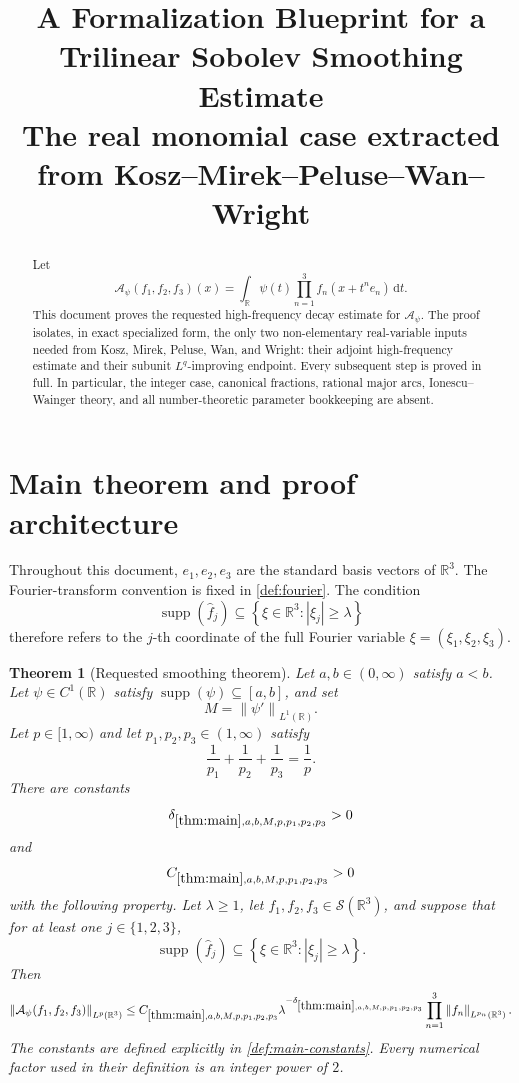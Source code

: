 \documentclass[11pt]{article}
\title{A Formalization Blueprint for a Trilinear Sobolev Smoothing Estimate\\
\large The real monomial case extracted from Kosz--Mirek--Peluse--Wan--Wright}
\author{}
\date{}
\newtheorem{theorem}{Theorem}[section]
\newcommand{\R}{\mathbb{R}}
\newcommand{\Sch}{\mathcal{S}}
\newcommand{\supp}{\operatorname{supp}}
\newcommand{\A}{\mathcal{A}}
\newcommand{\dd}{\,\mathrm{d}}
\newcommand{\norm}[2]{\left\lVert #1\right\rVert_{#2}}
\newcommand{\Cst}[2]{C_{\ref{#1},#2}}
\newcommand{\Exp}[2]{\delta_{\ref{#1},#2}}
\newcommand{\abs}[1]{\left|#1\right|}
\newcommand{\set}[1]{\left\{#1\right\}}
\newcommand{\indices}{\{1,2,3\}}
\begin{document}
\maketitle

\begin{abstract}
Let
\[
\A_{\psi}(f_1,f_2,f_3)(x)
=
\int_{\R}\psi(t)\prod_{n=1}^{3}f_n(x+t^n e_n)\dd t.
\]
This document proves the requested high-frequency decay estimate for \(\A_\psi\).  The proof isolates, in exact specialized form, the only two non-elementary real-variable inputs needed from Kosz, Mirek, Peluse, Wan, and Wright: their adjoint high-frequency estimate and their subunit \(L^q\)-improving endpoint.  Every subsequent step is proved in full.  In particular, the integer case, canonical fractions, rational major arcs, Ionescu--Wainger theory, and all number-theoretic parameter bookkeeping are absent.
\end{abstract}

\tableofcontents

\section{Main theorem and proof architecture}

Throughout this document, \(e_1,e_2,e_3\) are the standard basis vectors of \(\R^3\).  The Fourier-transform convention is fixed in \cref{def:fourier}.  The condition
\[
\supp(\widehat f_j)\subseteq\set{\xi\in\R^3:\abs{\xi_j}\geq\lambda}
\]
therefore refers to the \(j\)-th coordinate of the full Fourier variable \(\xi=(\xi_1,\xi_2,\xi_3)\).

\begin{theorem}[Requested smoothing theorem]\label{thm:main}
Let \(a,b\in(0,\infty)\) satisfy \(a<b\).  Let \(\psi\in C^1(\R)\) satisfy \(\supp(\psi)\subseteq[a,b]\), and set
\[
M=\norm{\psi'}{L^1(\R)}.
\]
Let \(p\in[1,\infty)\) and let \(p_1,p_2,p_3\in(1,\infty)\) satisfy
\[
\frac1{p_1}+\frac1{p_2}+\frac1{p_3}=\frac1p.
\]
There are constants
\[
\Exp{thm:main}{a,b,M,p,p_1,p_2,p_3}>0
\]
and
\[
\Cst{thm:main}{a,b,M,p,p_1,p_2,p_3}>0
\]
with the following property.  Let \(\lambda\geq1\), let \(f_1,f_2,f_3\in\Sch(\R^3)\), and suppose that for at least one \(j\in\indices\),
\[
\supp(\widehat f_j)\subseteq\set{\xi\in\R^3:\abs{\xi_j}\geq\lambda}.
\]
Then
\[
\norm{\A_\psi(f_1,f_2,f_3)}{L^p(\R^3)}
\leq
\Cst{thm:main}{a,b,M,p,p_1,p_2,p_3}
\lambda^{-\Exp{thm:main}{a,b,M,p,p_1,p_2,p_3}}
\prod_{n=1}^{3}\norm{f_n}{L^{p_n}(\R^3)}.
\]
The constants are defined explicitly in \cref{def:main-constants}.  Every numerical factor used in their definition is an integer power of \(2\).
\end{theorem}
\end{document}
